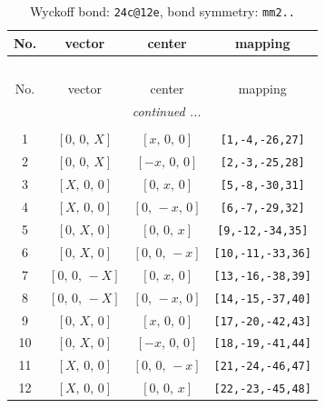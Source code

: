 \documentclass[fleqn,8pt]{jsarticle}
\begin{document}
\begin{longtable}{cccc}
\caption{Wyckoff bond: {\tt 24c@12e}, bond symmetry: {\tt mm2..}}
 \\
 \hline \hline
No. & vector & center & mapping \\ \hline \endfirsthead

\multicolumn{3}{l}{\tablename\ \thetable{}} \\
 \hline \hline
No. & vector & center & mapping \\ \hline \endhead

 \hline \hline
\multicolumn{3}{r}{\footnotesize\it continued ...} \\ \endfoot

 \hline \hline
\multicolumn{3}{r}{} \\ \endlastfoot

1 & $\left[ 0,\, 0,\, X \right]$ & $\left[ x,\, 0,\, 0 \right]$ & {\tt [1,-4,-26,27]} \\ \hline
2 & $\left[ 0,\, 0,\, X \right]$ & $\left[ - x,\, 0,\, 0 \right]$ & {\tt [2,-3,-25,28]} \\ \hline
3 & $\left[ X,\, 0,\, 0 \right]$ & $\left[ 0,\, x,\, 0 \right]$ & {\tt [5,-8,-30,31]} \\ \hline
4 & $\left[ X,\, 0,\, 0 \right]$ & $\left[ 0,\, - x,\, 0 \right]$ & {\tt [6,-7,-29,32]} \\ \hline
5 & $\left[ 0,\, X,\, 0 \right]$ & $\left[ 0,\, 0,\, x \right]$ & {\tt [9,-12,-34,35]} \\ \hline
6 & $\left[ 0,\, X,\, 0 \right]$ & $\left[ 0,\, 0,\, - x \right]$ & {\tt [10,-11,-33,36]} \\ \hline
7 & $\left[ 0,\, 0,\, - X \right]$ & $\left[ 0,\, x,\, 0 \right]$ & {\tt [13,-16,-38,39]} \\ \hline
8 & $\left[ 0,\, 0,\, - X \right]$ & $\left[ 0,\, - x,\, 0 \right]$ & {\tt [14,-15,-37,40]} \\ \hline
9 & $\left[ 0,\, X,\, 0 \right]$ & $\left[ x,\, 0,\, 0 \right]$ & {\tt [17,-20,-42,43]} \\ \hline
10 & $\left[ 0,\, X,\, 0 \right]$ & $\left[ - x,\, 0,\, 0 \right]$ & {\tt [18,-19,-41,44]} \\ \hline
11 & $\left[ X,\, 0,\, 0 \right]$ & $\left[ 0,\, 0,\, - x \right]$ & {\tt [21,-24,-46,47]} \\ \hline
12 & $\left[ X,\, 0,\, 0 \right]$ & $\left[ 0,\, 0,\, x \right]$ & {\tt [22,-23,-45,48]} \\
\end{longtable}
\renewcommand{\arraystretch}{1.2}
\end{document}
